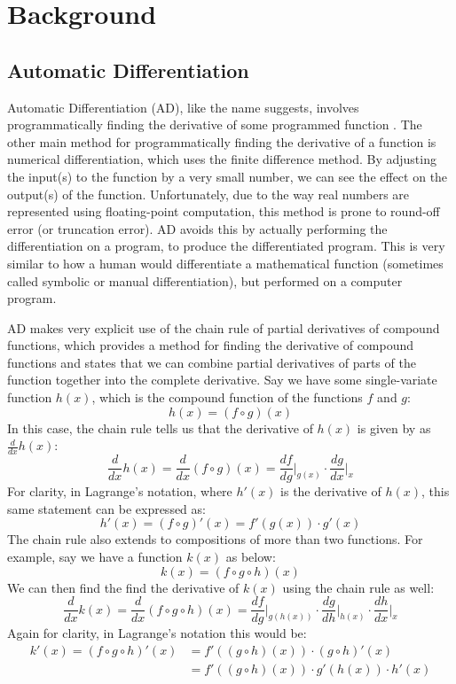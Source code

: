 \section{Background}
    \subsection{Automatic Differentiation} \label{sec:bg_ad}
        Automatic Differentiation (AD), like the name suggests, involves programmatically finding the derivative of some programmed function \cite{margossian2019review}.
        The other main method for programmatically finding the derivative of a function is numerical differentiation, which uses the finite difference method.
        By adjusting the input(s) to the function by a very small number, we can see the effect on the output(s) of the function.
        Unfortunately, due to the way real numbers are represented using floating-point computation, this method is prone to round-off error (or truncation error).
        AD avoids this by actually performing the differentiation on a program, to produce the differentiated program.
        This is very similar to how a human would differentiate a mathematical function (sometimes called symbolic or manual differentiation), but performed on a computer program.
        
        AD makes very explicit use of the chain rule of partial derivatives of compound functions, which provides a method for finding the derivative of compound functions and states that we can combine partial derivatives of parts of the function together into the complete derivative.
        Say we have some single-variate function $h(x)$, which is the compound function of the functions $f$ and $g$:
        \[h(x)=(f\circ g)(x)\]
        In this case, the chain rule tells us that the derivative of $h(x)$ is given by as $\tfrac{d}{dx}h(x)$:
        \[\frac{d}{dx}h(x)=\frac{d}{dx}(f\circ g)(x)=\frac{df}{dg}\biggr|_{g(x)}\cdot\frac{dg}{dx}\biggr|_x\]
        For clarity, in Lagrange's notation, where $h'(x)$ is the derivative of $h(x)$, this same statement can be expressed as:
        \[h'(x)=(f\circ g)'(x)=f'(g(x))\cdot g'(x)\]
        The chain rule also extends to compositions of more than two functions.
        For example, say we have a function $k(x)$ as below:
        \[k(x)=(f\circ g\circ h)(x)\]
        We can then find the find the derivative of $k(x)$ using the chain rule as well:
        \[\frac{d}{dx}k(x)=\frac{d}{dx}(f\circ g\circ h)(x)=\frac{df}{dg}\biggr|_{g(h(x))}\cdot\frac{dg}{dh}\biggr|_{h(x)}\cdot\frac{dh}{dx}\biggr|_x\]
        Again for clarity, in Lagrange's notation this would be:
        \begin{align*}
            k'(x)=(f\circ g\circ h)'(x)&=f'((g\circ h)(x))\cdot(g\circ h)'(x)\\
            &=f'((g\circ h)(x))\cdot g'(h(x))\cdot h'(x)
        \end{align*}

